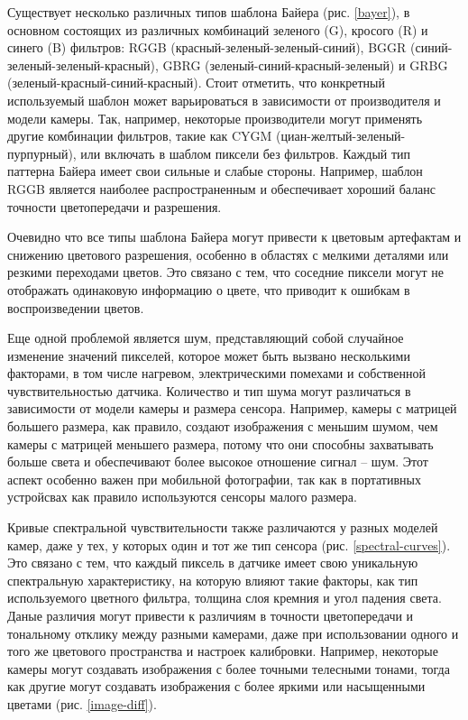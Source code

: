 Существует несколько различных типов шаблона Байера (рис. \ref{bayer}), в основном состоящих из различных комбинаций зеленого (G), кросого (R) и синего (B) фильтров: RGGB (красный-зеленый-зеленый-синий), BGGR (синий-зеленый-зеленый-красный), GBRG (зеленый-синий-красный-зеленый) и GRBG (зеленый-красный-синий-красный). Стоит отметить, что конкретный используемый шаблон может варьироваться в зависимости от производителя и модели камеры. Так, например, некоторые производители могут применять другие комбинации фильтров, такие как CYGM (циан-желтый-зеленый-пурпурный), или включать в шаблом пиксели без фильтров. Каждый тип паттерна Байера имеет свои сильные и слабые стороны. Например, шаблон RGGB является наиболее распространенным и обеспечивает хороший баланс точности цветопередачи и разрешения.

Очевидно что все типы шаблона Байера могут привести к цветовым артефактам и снижению цветового разрешения, особенно в областях с мелкими деталями или резкими переходами цветов. Это связано с тем, что соседние пиксели могут не отображать одинаковую информацию о цвете, что приводит к ошибкам в воспроизведении цветов.

Еще одной проблемой является шум, представляющий собой случайное изменение значений пикселей, которое может быть вызвано несколькими факторами, в том числе нагревом, электрическими помехами и собственной чувствительностью датчика. Количество и тип шума могут различаться в зависимости от модели камеры и размера сенсора. Например, камеры с матрицей большего размера, как правило, создают изображения с меньшим шумом, чем камеры с матрицей меньшего размера, потому что они способны захватывать больше света и обеспечивают более высокое отношение сигнал -- шум. Этот аспект особенно важен при мобильной фотографии, так как в портативных устройсвах как правило используются сенсоры малого размера.

Кривые спектральной чувствительности также различаются у разных моделей камер, даже у тех, у которых один и тот же тип сенсора (рис. \ref{spectral-curves}). Это связано с тем, что каждый пиксель в датчике имеет свою уникальную спектральную характеристику, на которую влияют такие факторы, как тип используемого цветного фильтра, толщина слоя кремния и угол падения света. Даные различия могут привести к различиям в точности цветопередачи и тональному отклику между разными камерами, даже при использовании одного и того же цветового пространства и настроек калибровки. Например, некоторые камеры могут создавать изображения с более точными телесными тонами, тогда как другие могут создавать изображения с более яркими или насыщенными цветами (рис. \ref{image-diff}).

